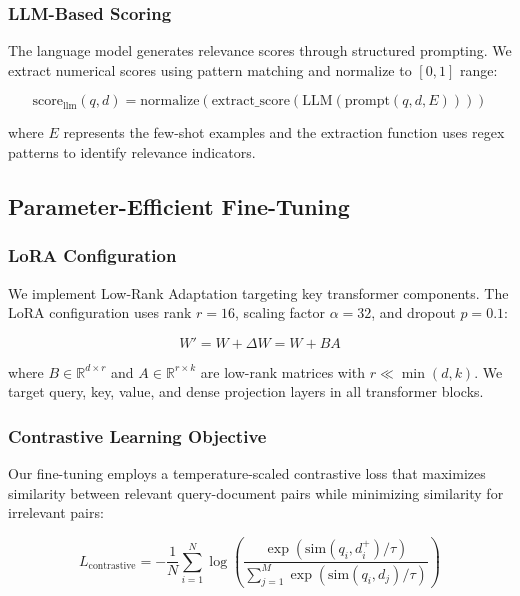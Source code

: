 \documentclass[runningheads]{llncs}
\begin{document}
\subsubsection{LLM-Based Scoring}
The language model generates relevance scores through structured prompting. We extract numerical scores using pattern matching and normalize to $[0,1]$ range:

\begin{equation}
\text{score}_{\text{llm}}(q,d) = \text{normalize}(\text{extract\_score}(\text{LLM}(\text{prompt}(q,d,E))))
\end{equation}

where $E$ represents the few-shot examples and the extraction function uses regex patterns to identify relevance indicators.

\subsection{Parameter-Efficient Fine-Tuning}

\subsubsection{LoRA Configuration}
We implement Low-Rank Adaptation targeting key transformer components. The LoRA configuration uses rank $r=16$, scaling factor $\alpha=32$, and dropout $p=0.1$:

\begin{equation}
W' = W + \Delta W = W + BA
\end{equation}

where $B \in \mathbb{R}^{d \times r}$ and $A \in \mathbb{R}^{r \times k}$ are low-rank matrices with $r \ll \min(d,k)$. We target query, key, value, and dense projection layers in all transformer blocks.

\subsubsection{Contrastive Learning Objective}
Our fine-tuning employs a temperature-scaled contrastive loss that maximizes similarity between relevant query-document pairs while minimizing similarity for irrelevant pairs:

\begin{equation}
L_{\text{contrastive}} = -\frac{1}{N} \sum_{i=1}^{N} \log\left(\frac{\exp(\text{sim}(q_i,d_i^+)/\tau)}{\sum_{j=1}^{M} \exp(\text{sim}(q_i,d_j)/\tau)}\right)
\end{equation}
\end{document}
